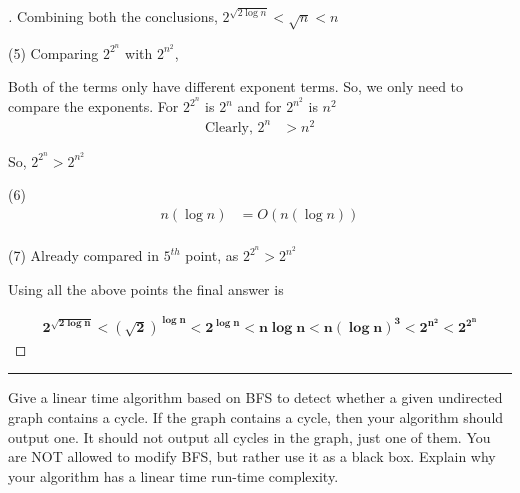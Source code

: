 \documentclass[a4paper, 12pt]{article}
\begin{document}
\begin{proof}[\color{red}{Solution}]
\hspace{4em} Combining both the conclusions, \emph{$2^{\sqrt{2 \log n}} < \sqrt{n} < n$}

\bigskip
(5) \hspace{1em} 
Comparing $2^{2^n}$ with $2^{n^2}$, 

\hspace{4em} Both of the terms only have different exponent terms. So, we only need to compare the exponents. For $2^{2^n}$ is $2^n$ and for $2^{n^2}$ is $n^2$
\begin{align*}
    \text{Clearly, }  2^n &> n^2 
\end{align*}

\hspace{4em} So, $2^{2^n} > 2^{n^2}$

(6) \hspace{1em} 
\begin{align*}
    n (\log n) &= O(n (\log n)) \\
\end{align*}

(7) \hspace{1em} Already compared in $5^{th}$ point, as $2^{2^n} > 2^{n^2}$ 

\bigskip
Using all the above points the final answer is 

\begin{align*}
    \bm{2^{\sqrt{2 \log n}} < (\sqrt{2})^{\log n} < 2^{\log n} < n \log n < n (\log n)^3 < 2^{n^2} < 2^{2^n}} 
\end{align*}
\end{proof}



\hrule
\bigskip
\begin{question}[2]
Give a linear time algorithm based on BFS to detect whether a given undirected graph
contains a cycle. If the graph contains a cycle, then your algorithm should output one. It should
not output all cycles in the graph, just one of them. You are NOT allowed to modify BFS, but
rather use it as a black box. Explain why your algorithm has a linear time run-time complexity.

\end{question}
\end{document}
